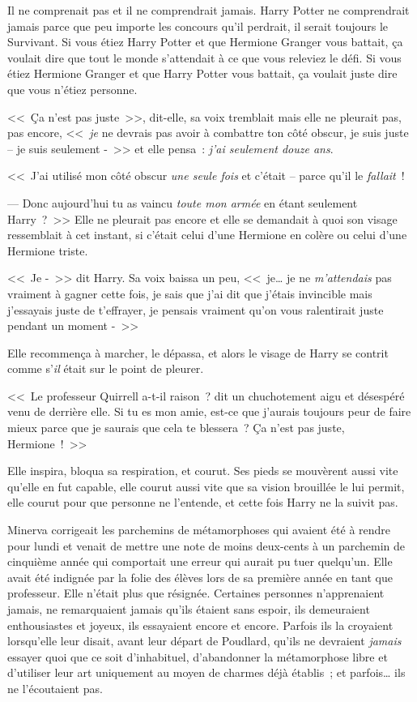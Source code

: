 Il ne comprenait pas et il ne comprendrait jamais. Harry Potter ne comprendrait jamais parce que peu importe les concours qu'il perdrait, il serait toujours le Survivant. Si vous étiez Harry Potter et que Hermione Granger vous battait, ça voulait dire que tout le monde s'attendait à ce que vous releviez le défi. Si vous étiez Hermione Granger et que Harry Potter vous battait, ça voulait juste dire que vous n'étiez personne.

<<~Ça n'est pas juste~>>, dit-elle, sa voix tremblait mais elle ne pleurait pas, pas encore, <<~\emph{je} ne devrais pas avoir à combattre ton côté obscur, je suis juste -- je suis seulement -~>> et elle pensa~: \emph{j'ai seulement douze ans}.

<<~J'ai utilisé mon côté obscur \emph{une seule fois} et c'était -- parce qu'il le \emph{fallait}~!

--- Donc aujourd'hui tu as vaincu \emph{toute mon armée} en étant seulement Harry~?~>> Elle ne pleurait pas encore et elle se demandait à quoi son visage ressemblait à cet instant, si c'était celui d'une Hermione en colère ou celui d'une Hermione triste.

<<~Je -~>> dit Harry. Sa voix baissa un peu, <<~je… je ne \emph{m'attendais} pas vraiment à gagner cette fois, je sais que j'ai dit que j'étais invincible mais j'essayais juste de t'effrayer, je pensais vraiment qu'on vous ralentirait juste pendant un moment -~>>

Elle recommença à marcher, le dépassa, et alors le visage de Harry se contrit comme s'\emph{il} était sur le point de pleurer.

<<~Le professeur Quirrell a-t-il raison~? dit un chuchotement aigu et désespéré venu de derrière elle. Si tu es mon amie, est-ce que j'aurais toujours peur de faire mieux parce que je saurais que cela te blessera~? Ça n'est pas juste, Hermione~!~>>

Elle inspira, bloqua sa respiration, et courut. Ses pieds se mouvèrent aussi vite qu'elle en fut capable, elle courut aussi vite que sa vision brouillée le lui permit, elle courut pour que personne ne l'entende, et cette fois Harry ne la suivit pas.

\later

Minerva corrigeait les parchemins de métamorphoses qui avaient été à rendre pour lundi et venait de mettre une note de moins deux-cents à un parchemin de cinquième année qui comportait une erreur qui aurait pu tuer quelqu'un. Elle avait été indignée par la folie des élèves lors de sa première année en tant que professeur. Elle n'était plus que résignée. Certaines personnes n'apprenaient jamais, ne remarquaient jamais qu'ils étaient sans espoir, ils demeuraient enthousiastes et joyeux, ils essayaient encore et encore. Parfois ils la croyaient lorsqu'elle leur disait, avant leur départ de Poudlard, qu'ils ne devraient \emph{jamais} essayer quoi que ce soit d'inhabituel, d'abandonner la métamorphose libre et d'utiliser leur art uniquement au moyen de charmes déjà établis~; et parfois… ils ne l'écoutaient pas.

